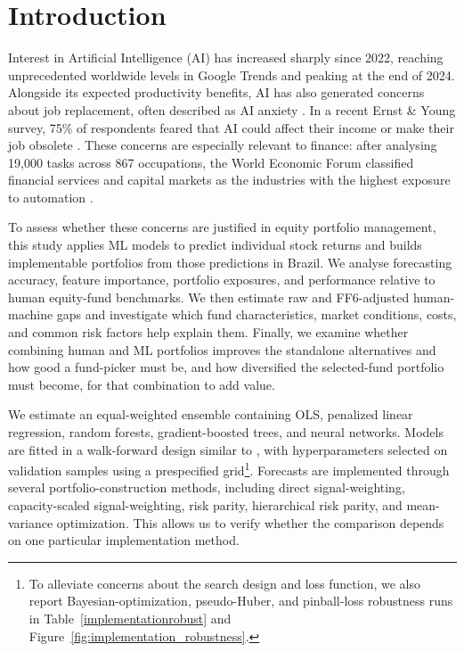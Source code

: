 \documentclass[preprint,12pt,authoryear]{elsarticle}
\begin{document}

\section{Introduction}
\label{sec:introduction}

Interest in Artificial Intelligence (AI) has increased sharply since 2022, reaching unprecedented worldwide levels in Google Trends and peaking at the end of 2024. Alongside its expected productivity benefits, AI has also generated concerns about job replacement, often described as AI anxiety \citep{lihuang2020}. In a recent Ernst \& Young survey, 75\% of respondents feared that AI could affect their income or make their job obsolete \citep{diasioetal2023}. These concerns are especially relevant to finance: after analysing 19,000 tasks across 867 occupations, the World Economic Forum classified financial services and capital markets as the industries with the highest exposure to automation \citep{WEO2023}.

To assess whether these concerns are justified in equity portfolio management, this study applies ML models to predict individual stock returns and builds implementable portfolios from those predictions in Brazil. We analyse forecasting accuracy, feature importance, portfolio exposures, and performance relative to human equity-fund benchmarks. We then estimate raw and FF6-adjusted human-machine gaps and investigate which fund characteristics, market conditions, costs, and common risk factors help explain them. Finally, we examine whether combining human and ML portfolios improves the standalone alternatives and how good a fund-picker must be, and how diversified the selected-fund portfolio must become, for that combination to add value.

We estimate an equal-weighted ensemble containing OLS, penalized linear regression, random forests, gradient-boosted trees, and neural networks. Models are fitted in a walk-forward design similar to \citet{gukellyxiu2020}, with hyperparameters selected on validation samples using a prespecified grid\footnote{To alleviate concerns about the search design and loss function, we also report Bayesian-optimization, pseudo-Huber, and pinball-loss robustness runs in Table~\ref{implementationrobust} and Figure~\ref{fig:implementation_robustness}.}. Forecasts are implemented through several portfolio-construction methods, including direct signal-weighting, capacity-scaled signal-weighting, risk parity, hierarchical risk parity, and mean-variance optimization. This allows us to verify whether the comparison depends on one particular implementation method.
\end{document}
